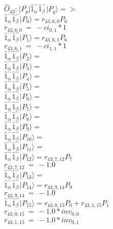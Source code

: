 \documentclass[14pt]{article}
\begin{document}
    $\hat{O}_{43}:  \langle{P_p}\vert \hat{1}_{\alpha}^{-}\hat{1}_{\beta}^{-} \vert{P_q}\rangle => $ \\ 
    $ \hat{1}_{\alpha}^{-}\hat{1}_{\beta}^{-} \vert{P_{0}}\rangle = {r}_{43,6,0}P_{6} $ \\ 
    ${r}_{43,6,0}\ =\ -{ci}_{0,1}*1 $ \\ 
    $ \hat{1}_{\alpha}^{-}\hat{1}_{\beta}^{-} \vert{P_{1}}\rangle = {r}_{43,6,1}P_{6} $ \\ 
    ${r}_{43,6,1}\ =\ -{ci}_{1,1}*1 $ \\ 
    $ \hat{1}_{\alpha}^{-}\hat{1}_{\beta}^{-} \vert{P_{2}}\rangle =  $ \\ 
    $ \hat{1}_{\alpha}^{-}\hat{1}_{\beta}^{-} \vert{P_{3}}\rangle =  $ \\ 
    $ \hat{1}_{\alpha}^{-}\hat{1}_{\beta}^{-} \vert{P_{4}}\rangle =  $ \\ 
    $ \hat{1}_{\alpha}^{-}\hat{1}_{\beta}^{-} \vert{P_{5}}\rangle =  $ \\ 
    $ \hat{1}_{\alpha}^{-}\hat{1}_{\beta}^{-} \vert{P_{6}}\rangle =  $ \\ 
    $ \hat{1}_{\alpha}^{-}\hat{1}_{\beta}^{-} \vert{P_{7}}\rangle =  $ \\ 
    $ \hat{1}_{\alpha}^{-}\hat{1}_{\beta}^{-} \vert{P_{8}}\rangle =  $ \\ 
    $ \hat{1}_{\alpha}^{-}\hat{1}_{\beta}^{-} \vert{P_{9}}\rangle =  $ \\ 
    $ \hat{1}_{\alpha}^{-}\hat{1}_{\beta}^{-} \vert{P_{10}}\rangle =  $ \\ 
    $ \hat{1}_{\alpha}^{-}\hat{1}_{\beta}^{-} \vert{P_{11}}\rangle =  $ \\ 
    $ \hat{1}_{\alpha}^{-}\hat{1}_{\beta}^{-} \vert{P_{12}}\rangle = {r}_{43,7,12}P_{7} $ \\ 
    ${r}_{43,7,12}\ =\ -1.0 $ \\ 
    $ \hat{1}_{\alpha}^{-}\hat{1}_{\beta}^{-} \vert{P_{13}}\rangle =  $ \\ 
    $ \hat{1}_{\alpha}^{-}\hat{1}_{\beta}^{-} \vert{P_{14}}\rangle = {r}_{43,9,14}P_{9} $ \\ 
    ${r}_{43,9,14}\ =\ -1.0 $ \\ 
    $ \hat{1}_{\alpha}^{-}\hat{1}_{\beta}^{-} \vert{P_{15}}\rangle = {r}_{43,0,15}P_{0}+{r}_{43,1,15}P_{1} $ \\ 
    ${r}_{43,0,15}\ =\ -1.0*{inv}_{0,0} $ \\ 
    ${r}_{43,1,15}\ =\ -1.0*{inv}_{0,1} $ \\ 
    
\end{document}
